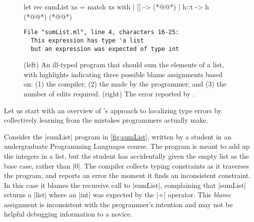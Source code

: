 \label{sec:overview}


\begin{figure}[t!]
\begin{minipage}{0.45\linewidth}
\begin{ecode}
  let rec sumList xs =
    match xs with
    | []   -> (*@\hlTree{\hlSherrloc{[]}}@*)
    | h::t -> h (*@\hlTree{+}@*) (*@@*)
\end{ecode}
\end{minipage}
\begin{minipage}{0.49\linewidth}
\begin{verbatim}
File "sumList.ml", line 4, characters 16-25:
  This expression has type 'a list
  but an expression was expected of type int
\end{verbatim}
\end{minipage}
\caption{(left) An ill-typed \ocaml program that should sum the elements of a
  list, with highlights indicating three possible blame assignments based on:
  (1) the \hlFix{\ocaml} compiler;
  (2) the  made by the programmer; and
  (3)  the number of edits required.
  (right) The error reported by \ocaml.}
\label{fig:sumList}
\end{figure}


Let us start with an overview of \toolname's
approach to localizing type errors by
collectively learning from the mistakes
programmers actually make.

%
Consider the |sumList| program in
\autoref{fig:sumList}, written by
a student in an undergraduate
Programming Languages course.
%
The program is meant to add up the
integers in a list, but the student
has accidentally given the empty
list as the base case, rather than |0|.
%
The \ocaml compiler collects typing
constraints as it traverses the program,
and reports an error the moment it finds
an inconsistent constraint.
%
In this case it blames the recursive call
to |sumList|, complaining that |sumList|
returns a |list| where an |int| was
expected by the |+| operator.
%
This \emph{blame} assignment is inconsistent
with the programmer's intention and may
not be helpful debugging information to
a novice.

